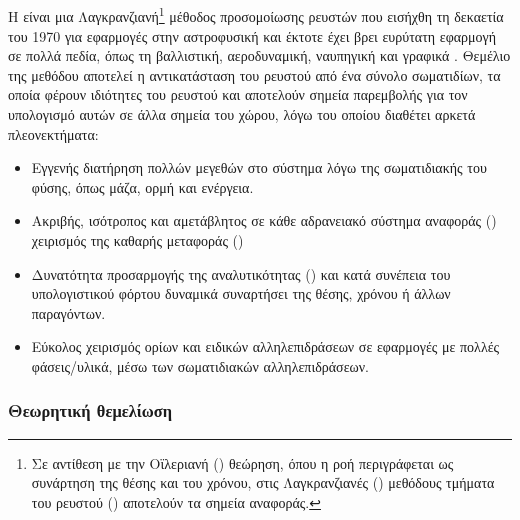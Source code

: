 \subsection{\texorpdfstring{}{}}
\paragraph{} Η  είναι μια Λαγκρανζιανή\footnote{Σε αντίθεση με την Οϊλεριανή
  () θεώρηση, όπου η ροή περιγράφεται ως συνάρτηση της θέσης και του χρόνου,
  στις Λαγκρανζιανές () μεθόδους τμήματα του ρευστού ()
  αποτελούν τα σημεία αναφοράς.} μέθοδος προσομοίωσης ρευστών που εισήχθη τη δεκαετία του
1970 για εφαρμογές στην αστροφυσική \cite{gingold1977375, lucy19771013} και έκτοτε έχει
βρει ευρύτατη εφαρμογή σε πολλά πεδία, όπως τη βαλλιστική, αεροδυναμική, ναυπηγική και
γραφικά \cite{monaghan20051703}. Θεμέλιο της μεθόδου αποτελεί η αντικατάσταση του ρευστού
από ένα σύνολο σωματιδίων, τα οποία φέρουν ιδιότητες του ρευστού και αποτελούν σημεία
παρεμβολής για τον υπολογισμό αυτών σε άλλα σημεία του χώρου, λόγω του οποίου διαθέτει
αρκετά πλεονεκτήματα:
\begin{itemize}
\item Εγγενής διατήρηση πολλών μεγεθών στο σύστημα λόγω της σωματιδιακής του φύσης, όπως
  μάζα, ορμή και ενέργεια.
\item Ακριβής, ισότροπος και αμετάβλητος σε κάθε αδρανειακό σύστημα αναφοράς
  () χειρισμός της καθαρής μεταφοράς ()
\item Δυνατότητα προσαρμογής της αναλυτικότητας () και κατά συνέπεια του
  υπολογιστικού φόρτου δυναμικά συναρτήσει της θέσης, χρόνου ή άλλων παραγόντων.
\item Εύκολος χειρισμός ορίων και ειδικών αλληλεπιδράσεων σε εφαρμογές με πολλές
  φάσεις/υλικά, μέσω των σωματιδιακών αλληλεπιδράσεων.
\end{itemize}

\subsubsection{Θεωρητική θεμελίωση}
